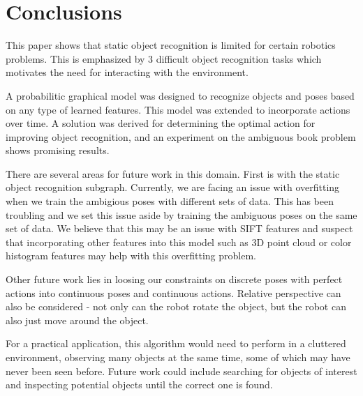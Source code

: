 \section{Conclusions}
    
    This paper shows that static object recognition is limited for certain robotics problems. This is emphasized by 3 difficult object recognition tasks which motivates the need for interacting with the environment. 

    A probabilitic graphical model was designed to recognize objects and poses based on any type of learned features. This model was extended to incorporate actions over time. A solution was derived for determining the optimal action for improving object recognition, and an experiment on the ambiguous book problem shows promising results.

    There are several areas for future work in this domain. First is with the static object recognition subgraph. Currently, we are facing an issue with overfitting when we train the ambigious poses with different sets of data. This has been troubling and we set this issue aside by training the ambiguous poses on the same set of data. We believe that this may be an issue with SIFT features and suspect that incorporating other features into this model such as 3D point cloud or color histogram features may help with this overfitting problem.

    Other future work lies in loosing our constraints on discrete poses with perfect actions into continuous poses and continuous actions. Relative perspective can also be considered - not only can the robot rotate the object, but the robot can also just move around the object.

    For a practical application, this algorithm would need to perform in a cluttered environment, observing many objects at the same time, some of which may have never been seen before. Future work could include searching for objects of interest and inspecting potential objects until the correct one is found.

